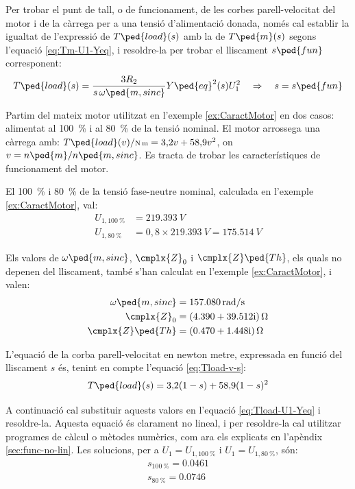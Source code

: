 Per trobar el punt de tall, o de funcionament, de les corbes parell-velocitat del motor i de la càrrega per a una tensió d'alimentació donada, només cal establir la igualtat de l'expressió de $T\ped{load}(s)$ amb la de $T\ped{m}(s)$ segons l'equació \eqref{eq:Tm-U1-Yeq}, i resoldre-la per  trobar el lliscament $s\ped{fun}$ corresponent:
\begin{equation}\label{eq:Tload-U1-Yeq}
	T\ped{load}(s) = \frac{3 R_2}{s\,\omega\ped{m,sinc}} Y\ped{eq}^2(s) U_1^2 \quad\Rightarrow \quad s=s\ped{fun}
\end{equation}


\begin{exemple}\label{ex:MotTensRedSolEx}
	\addcontentsxms{\MotTensRedSolEx}
	Partim del mateix motor utilitzat en l'exemple \vref{ex:CaractMotor} en dos casos: alimentat al \qty{100}{\%} i al \qty{80}{\%} de la tensió nominal. El motor arrossega una càrrega amb: $T\ped{load}(v) /{\scriptstyle \unit{N.m}} = 3{,}2 v + 58{,}9 v^2$, on $v = n\ped{m}/n\ped{m,sinc}$. Es tracta de trobar les característiques de funcionament del motor.
	
	El \qty{100}{\%} i \qty{80}{\%} de la tensió fase-neutre nominal, calculada  en l'exemple \ref{ex:CaractMotor}, val:
	\begin{align*}
		U_{1,\qty{100}{\%}} &= \qty{219,393}{V} \\
		U_{1,\qty{80}{\%}} &= 0{,}8\times\qty{219,393}{V} = \qty{175,514}{V}
	\end{align*}

	Els valors de $\omega\ped{m,sinc}$, $\cmplx{Z}_0$ i  $\cmplx{Z}\ped{Th}$, els quals no depenen del lliscament, també s'han calculat en  l'exemple \ref{ex:CaractMotor}, i valen:
	\vspace{-2mm}
	\begin{align*}
		\omega\ped{m,sinc} &=  \qty{157,080}{rad/s} \\
		\cmplx{Z}_0 &=  \complexqty{4,390+j39,512}{\ohm} \\
		\cmplx{Z}\ped{Th} &= \complexqty{0,470+j1,448}{\ohm} 
	\end{align*}
	
	L'equació de la corba parell-velocitat en newton metre, expressada en funció del lliscament $s$ és, tenint en compte l'equació \eqref{eq:Tload-v-s}:
	\[
		T\ped{load}(s) = 3{,}2 (1-s) + 58{,}9 (1-s)^2
	\]

	A continuació cal substituir aquests valors en l'equació \eqref{eq:Tload-U1-Yeq} i resoldre-la. Aquesta equació és clarament no lineal, i per  resoldre-la cal utilitzar programes de càlcul o mètodes numèrics, com ara els explicats en l'apèndix \ref{sec:func-no-lin}. Les solucions, per a $U_1=U_{1,\qty{100}{\%}}$ i $U_1=U_{1,\qty{80}{\%}}$, són:
	\begin{align*}
		s_{\qty{100}{\%}} = \num{0,0461} \\
	 	s_{\qty{80}{\%}}= \num{0,0746}
	\end{align*}	
	

\end{exemple}
